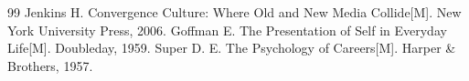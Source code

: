 \begin{thebibliography}{99}
 Jenkins H. Convergence Culture: Where Old and New Media Collide[M]. New York University Press, 2006.
 Goffman E. The Presentation of Self in Everyday Life[M]. Doubleday, 1959.
 Super D. E. The Psychology of Careers[M]. Harper \& Brothers, 1957.
\end{thebibliography}
